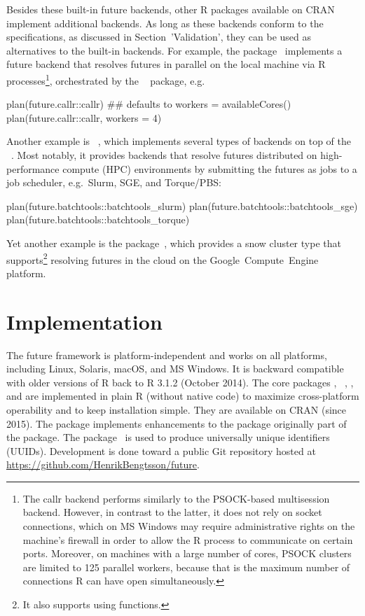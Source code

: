 Besides these built-in future backends, other R packages available on
CRAN implement additional backends.  As long as these backends conform
to the  specifications, as discussed in
Section~'Validation', they can be used as alternatives to the built-in
backends.
%
For example, the 
package~\citep{CRAN:future.callr} implements a future backend that
resolves futures in parallel on the local machine via R
processes\footnote{The callr backend performs similarly to the
PSOCK-based multisession backend. However, in contrast to the latter,
it does not rely on socket connections, which on MS Windows may
require administrative rights on the machine's firewall in order to
allow the R process to communicate on certain ports. Moreover, on
machines with a large number of cores, PSOCK clusters are limited to
125 parallel workers, because that is the maximum number of
connections R can have open simultaneously.}, orchestrated by
the ~\citep{CRAN:callr} package, e.g.
\begin{example}
plan(future.callr::callr)  ## defaults to workers = availableCores()
plan(future.callr::callr, workers = 4)
\end{example}
Another example
is ~\citep{CRAN:future.batchtools}, which
implements several types of backends on top of the
~\citep{Lang_etal_2017}.  Most notably, it provides
backends that resolve futures distributed on high-performance compute
(HPC) environments by submitting the futures as jobs to a job
scheduler, e.g.\ Slurm, SGE, and Torque/PBS:
\begin{example}
plan(future.batchtools::batchtools_slurm)
plan(future.batchtools::batchtools_sge)
plan(future.batchtools::batchtools_torque)
\end{example}
%
Yet another example is the 
package~\citep{CRAN:googleComputeEngineR}, which provides a snow
cluster type that supports\footnote{It also supports
using  functions.}  resolving futures in the cloud
on the Google~Compute~Engine platform.


\section{Implementation}

The future framework is platform-independent and works on all
platforms, including Linux, Solaris, macOS, and MS Windows.  It is
backward compatible with older versions of R back to R 3.1.2 (October
2014).  The core packages ,
~\citep{CRAN:parallelly}, , and
 are implemented in plain R (without native code) to
maximize cross-platform operability and to keep installation simple.
They are available on CRAN (since 2015).  The  package
implements enhancements to the  package originally part
of the  package.  The 
package~\citep{CRAN:digest} is used to produce universally unique
identifiers (UUIDs).  Development is done toward a public Git
repository hosted at \url{https://github.com/HenrikBengtsson/future}.

